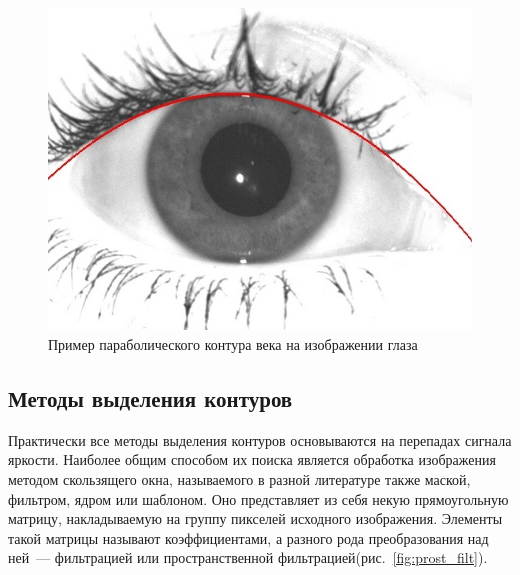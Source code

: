 \documentclass[12pt]{article} %
\begin{document}
\begin{figure}[h]
	
	\centering
	
	\includegraphics[width=0.6\linewidth]{glaz5.jpg}
	
	\caption{Пример параболического контура века на изображении глаза}
	
	\label{fig:glaz5}
	
\end{figure}

\newpage
\subsection{Методы выделения контуров}

Практически все методы выделения контуров основываются на перепадах сигнала яркости. Наиболее общим способом их поиска является обработка изображения методом скользящего окна, называемого в разной литературе также маской, фильтром, ядром или шаблоном. Оно представляет из себя некую прямоугольную матрицу, накладываемую на группу пикселей исходного изображения. Элементы такой матрицы называют коэффициентами, а разного рода преобразования над ней~--- фильтрацией или пространственной фильтрацией(рис.~\ref{fig:prost_filt}).
\end{document}

